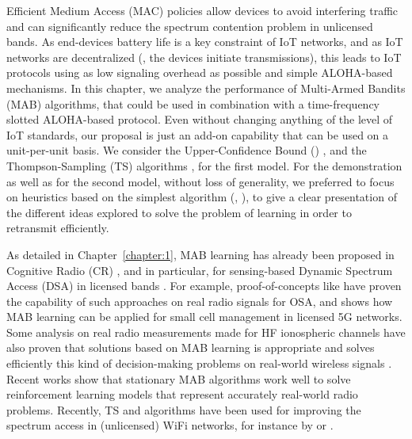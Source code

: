 Efficient Medium Access (MAC) policies allow devices to avoid interfering traffic and can significantly reduce the spectrum contention problem in unlicensed bands.
As end-devices battery life is a key constraint of IoT networks,
and as IoT networks are decentralized (\ie, the devices initiate transmissions),
this leads to IoT protocols using as low signaling overhead as possible and simple ALOHA-based mechanisms.
%
In this chapter, we analyze the performance of Multi-Armed Bandits (MAB) algorithms, that could be used in combination with a time-frequency slotted ALOHA-based protocol.
Even without changing anything of the level of IoT standards, our proposal is just an add-on capability that can be used on a unit-per-unit basis.
We consider the Upper-Confidence Bound (\UCB) \cite{Auer02}, and the Thompson-Sampling (TS) algorithms \cite{Thompson33,AgrawalGoyal11,
Kaufmann12Thompson}, for the first model. For the demonstration as well as for the second model, without loss of generality, we preferred to focus on heuristics based on the simplest algorithm (\ie, \UCB), to give a clear presentation of the different ideas explored to solve the problem of learning in order to retransmit efficiently.

As detailed in Chapter~\ref{chapter:1},
MAB learning has already been proposed in Cognitive Radio (CR) \cite{Mitola99,Haykin05}, and in particular, for sensing-based Dynamic Spectrum Access (DSA) in licensed bands \cite{Jouini10}.
For example,
proof-of-concepts like \cite{kumar2016two} have proven the capability of such approaches on real radio signals for OSA,
and \cite{Maghsudi16} shows how MAB learning can be applied for small cell management in licensed 5G networks.
Some analysis on real radio measurements made for HF ionospheric channels have also proven that solutions based on MAB learning is appropriate and solves efficiently this kind of decision-making problems on real-world wireless signals \cite{Melian15}.
Recent works show that stationary MAB algorithms work well to solve reinforcement learning models that represent accurately real-world radio problems.
Recently, TS and \UCB{} algorithms have been used for improving the spectrum access in (unlicensed) WiFi networks, for instance by \cite{Toldov16} or \cite{Wilhelmi19collaborative,Wilhelmi19potential}.

